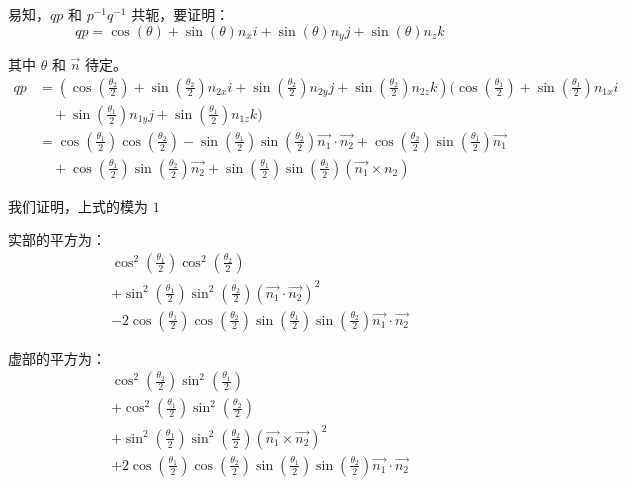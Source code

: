 \documentclass[withoutpreface,bwprint]{cumcmthesis} %
\begin{document}
易知，$qp$ 和 $p^{-1}q^{-1}$ 共轭，要证明：
\[
    qp = \cos(\theta) + \sin(\theta)n_xi + \sin(\theta)n_yj +
    \sin(\theta)n_zk
\]

其中 $\theta$ 和 $\overrightarrow{n}$ 待定。
\[
    \begin{split}
        qp &= (\cos(\frac{\theta _2}{2}) + \sin(\frac{\theta _2}{2})n_{2x}i
        + \sin(\frac{\theta _2}{2})n_{2y}j + \sin(\frac{\theta _2}{2})n_{2z}k)
        (\cos(\frac{\theta _1}{2}) + \sin(\frac{\theta _1}{2})n_{1x}i \\ &\quad +
        \sin(\frac{\theta _1}{2})n_{1y}j + \sin(\frac{\theta _1}{2})n_{1z}k) \\
        &= \cos(\frac{\theta _1}{2})\cos(\frac{\theta _2}{2}) - 
        \sin(\frac{\theta _1}{2})\sin(\frac{\theta _2}{2})\overrightarrow{n_1} 
        \cdot \overrightarrow{n_2} + \cos(\frac{\theta _2}{2})
        \sin(\frac{\theta _1}{2})\overrightarrow{n_1} \\&\quad + 
        \cos(\frac{\theta _1}{2})\sin(\frac{\theta _2}{2})\overrightarrow{n_2} +
        \sin(\frac{\theta _1}{2})\sin(\frac{\theta _2}{2})(\overrightarrow{n_1}
        \times n_2)
    \end{split}
\]

我们证明，上式的模为 $1$ \par
实部的平方为：
\begin{multline*}
    \cos ^2(\frac{\theta _1}{2})\cos ^2(\frac{\theta _2}{2}) \\ +
    \sin ^2(\frac{\theta _1}{2})\sin ^2(\frac{\theta _2}{2})
    (\overrightarrow{n_1} \cdot \overrightarrow{n_2})^2 \\ -
    2\cos(\frac{\theta _1}{2})\cos(\frac{\theta _2}{2})
    \sin(\frac{\theta _1}{2})\sin(\frac{\theta _2}{2})
    \overrightarrow{n_1} \cdot \overrightarrow{n_2} 
\end{multline*}

虚部的平方为：
\begin{multline*}
    \cos ^2(\frac{\theta _2}{2})\sin ^2(\frac{\theta _1}{2}) \\ +
    \cos ^2(\frac{\theta _1}{2})\sin ^2(\frac{\theta _2}{2}) \\ +
    \sin ^2(\frac{\theta _1}{2})\sin ^2(\frac{\theta _2}{2})
    (\overrightarrow{n_1} \times \overrightarrow{n_2})^2 \\ +
    2\cos(\frac{\theta _1}{2})\cos(\frac{\theta _2}{2})
    \sin(\frac{\theta _1}{2})\sin(\frac{\theta _2}{2})
    \overrightarrow{n_1} \cdot \overrightarrow{n_2} 
\end{multline*}
\end{document}
